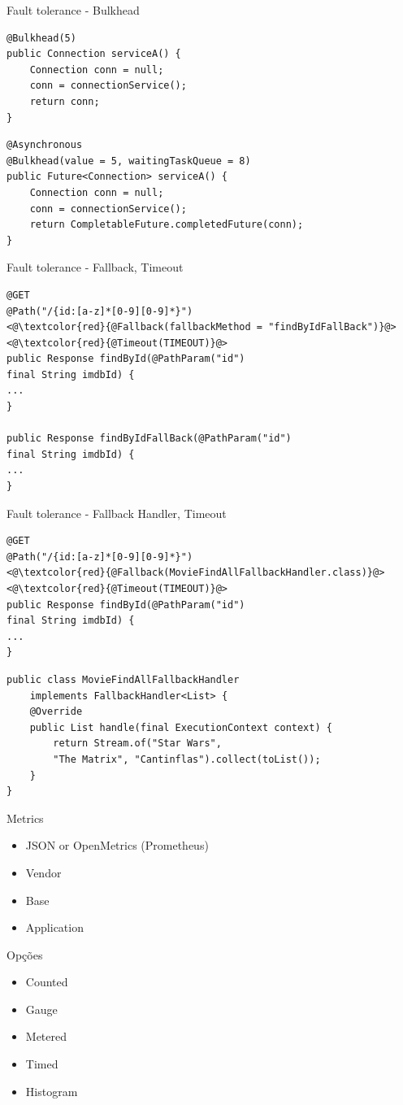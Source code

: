 \documentclass[aspectratio=169]{beamer}
\begin{document}
\begin{frame}[fragile]{Fault tolerance - Bulkhead}
\begin{lstlisting}
@Bulkhead(5)
public Connection serviceA() {
	Connection conn = null;
	conn = connectionService();
	return conn;
}
\end{lstlisting}

\begin{lstlisting}
@Asynchronous
@Bulkhead(value = 5, waitingTaskQueue = 8)
public Future<Connection> serviceA() {
	Connection conn = null;
	conn = connectionService();
	return CompletableFuture.completedFuture(conn);
}

\end{lstlisting}
\end{frame}



\begin{frame}[fragile]{Fault tolerance - Fallback, Timeout}
\begin{lstlisting}
@GET
@Path("/{id:[a-z]*[0-9][0-9]*}")
<@\textcolor{red}{@Fallback(fallbackMethod = "findByIdFallBack")}@>
<@\textcolor{red}{@Timeout(TIMEOUT)}@>
public Response findById(@PathParam("id")
final String imdbId) {
...
}

public Response findByIdFallBack(@PathParam("id")
final String imdbId) {
...
}
\end{lstlisting}
\end{frame}

\begin{frame}[fragile]{Fault tolerance - Fallback Handler, Timeout}
\begin{lstlisting}
@GET
@Path("/{id:[a-z]*[0-9][0-9]*}")
<@\textcolor{red}{@Fallback(MovieFindAllFallbackHandler.class)}@>
<@\textcolor{red}{@Timeout(TIMEOUT)}@>
public Response findById(@PathParam("id")
final String imdbId) {
...
}
\end{lstlisting}
\begin{lstlisting}
public class MovieFindAllFallbackHandler
	implements FallbackHandler<List> {
	@Override
	public List handle(final ExecutionContext context) {
		return Stream.of("Star Wars",
		"The Matrix", "Cantinflas").collect(toList());
	}
}
\end{lstlisting}
\end{frame}


\begin{frame}{Metrics}

\begin{itemize}
	\item JSON or OpenMetrics (Prometheus)
	\item Vendor
	\item Base
	\item Application
\end{itemize}

Opções
\begin{itemize}
	\item Counted
	\item Gauge
	\item Metered
	\item Timed
	\item Histogram
\end{itemize}

\end{frame}
\end{document}
